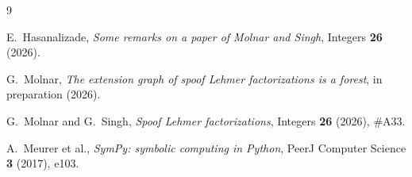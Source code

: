 \documentclass[11pt]{article}
\theoremstyle{definition}
\theoremstyle{remark}
\begin{document}
\begin{thebibliography}{9}

E.~Hasanalizade, \emph{Some remarks on a paper of Molnar and Singh},
Integers \textbf{26} (2026).

G.~Molnar, \emph{The extension graph of spoof Lehmer factorizations is a
forest}, in preparation (2026).

G.~Molnar and G.~Singh, \emph{Spoof Lehmer factorizations}, Integers
\textbf{26} (2026), \#A33.

A.~Meurer et al., \emph{SymPy: symbolic computing in Python}, PeerJ
Computer Science \textbf{3} (2017), e103.

\end{thebibliography}
\end{document}
